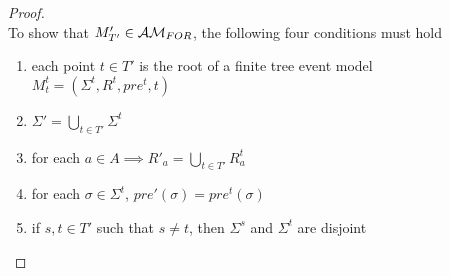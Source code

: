 \begin{proof}
\\
To show that $M'_{T'} \in \mathcal{AM}_{FOR}$, the following four conditions must hold
\begin{enumerate}
	\item each point $t \in T'$ is the root of a finite tree event model $M^t_t = (\Sigma^t, R^t, pre^t, t)$ \label{forestConOne}
  \item $\Sigma' = \bigcup_{t \in T'} \Sigma^t$ \label{forestConTwo}
  \item for each $a \in A \implies R'_a = \bigcup_{t \in T'} R^t_a$ \label{forestConFive}
	\item for each $\sigma \in \Sigma^t$, $pre'(\sigma) = pre^t(\sigma)$ \label{forestConThree}
	\item if $s, t \in T'$ such that $s \neq t$, then $\Sigma^s$ and $\Sigma^t$ are disjoint
	\label{forestConFour}
\end{enumerate}


\end{proof}

